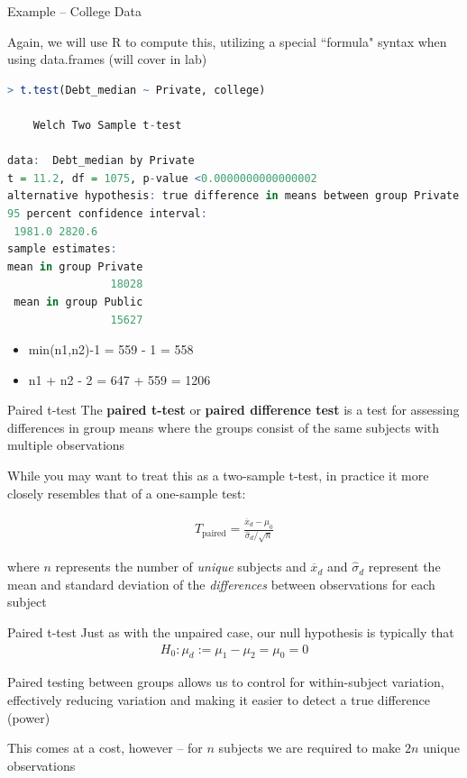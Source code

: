 \documentclass{beamer}
\begin{document}
\begin{frame}[fragile]{Example -- College Data}
\small

Again, we will use R to compute this, utilizing a special ``formula" syntax when using data.frames (will cover in lab)


\begin{lstlisting}[language=R]
> t.test(Debt_median ~ Private, college)

	Welch Two Sample t-test

data:  Debt_median by Private
t = 11.2, df = 1075, p-value <0.0000000000000002
alternative hypothesis: true difference in means between group Private and group Public is not equal to 0
95 percent confidence interval:
 1981.0 2820.6
sample estimates:
mean in group Private 
                18028 
 mean in group Public 
                15627 
\end{lstlisting}
\begin{itemize}
    \item min(n1,n2)-1 = 559 - 1 = 558
    \item n1 + n2 - 2 = 647 + 559 = 1206
\end{itemize}

\end{frame}


\begin{frame}{Paired t-test}
The \textbf{paired t-test} or \textbf{paired difference test} is a test for assessing differences in group means where the groups consist of the same subjects with multiple observations \vspace{4mm}

While you may want to treat this as a two-sample t-test, in practice it more closely resembles that of a one-sample test:

\begin{align*}
T_{\text{paired}} = \frac{\overline{x}_d - \mu_0}{\hat{\sigma}_d / \sqrt{n}}
\end{align*}

where $n$ represents the number of \textit{unique} subjects and $\overline{x}_d$ and $\hat{\sigma}_d$ represent the mean and standard deviation of the \textit{differences} between observations for each subject
\end{frame}


\begin{frame}{Paired t-test}
Just as with the unpaired case, our null hypothesis is typically that
\begin{align*}
H_0: \mu_d := \mu_1 - \mu_2 = \mu_0 = 0
\end{align*}

Paired testing between groups allows us to control for within-subject variation, effectively reducing variation and making it easier to detect a true difference (power) \vspace{4mm}

This comes at a cost, however -- for $n$ subjects we are required to make $2n$ unique observations
\end{frame}
\end{document}
